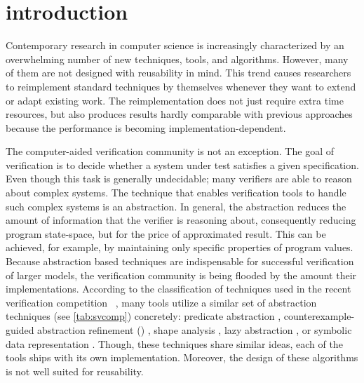 \chapter{introduction}
\label{ch:intro}


Contemporary research in computer science is increasingly characterized by
an overwhelming number of new techniques, tools, and algorithms.  However, many
of them are not designed with reusability in mind.  This trend causes
researchers to reimplement standard techniques by themselves whenever they want
to extend or adapt existing work.  The reimplementation does not just require
extra time resources, but also produces results hardly comparable with previous
approaches because the performance is becoming implementation-dependent.

The computer-aided verification community is not an exception. The goal of
verification is to decide whether a system under test satisfies a given
specification. Even though this task is generally undecidable; many verifiers
are able to reason about complex systems. The technique that enables
verification tools to handle such complex systems is an abstraction. In
general, the abstraction reduces the amount of information that the verifier is
reasoning about, consequently reducing program state-space, but for the price
of approximated result. This can be achieved, for example, by maintaining only
specific properties of program values. Because abstraction based techniques are
indispensable for successful verification of larger models, the verification
community is being flooded by the amount their implementations.  According to
the classification of techniques used in the recent verification competition
\svcomp~\cite{SVCOMP2019}, many tools utilize a similar set of abstraction
techniques (see \autoref{tab:svcomp}) concretely: predicate abstraction
\cite{Flanagan02},  coun\-ter\-example-guided abstraction refinement (\cegar)
\cite{Clarke20}, shape analysis \cite{Yang2008}, lazy abstraction
\cite{Henzinger2002}, or symbolic data representation
\cite{King76,Burch1990,Majumdar2018}. Though, these techniques share similar
ideas, each of the tools ships with its own implementation.  Moreover, the
design of these algorithms is not well suited for reusability.

